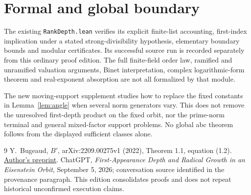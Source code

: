 \documentclass[11pt]{amsart}
\theoremstyle{definition}\newtheorem{definition}[theorem]{Definition}
\theoremstyle{remark}\newtheorem{remark}[theorem]{Remark}
\begin{document}
\section{Formal and global boundary}
The existing \texttt{RankDepth.lean} verifies its explicit finite-list accounting, first-index implication under a stated strong-divisibility hypothesis, elementary boundary bounds and modular certificates. Its successful source run is recorded separately from this ordinary proof edition. The full finite-field order law, ramified and unramified valuation arguments, Binet interpretation, complex logarithmic-form theorem and real-exponent absorption are not all formalized by that module.

The new moving-support supplement studies how to replace the fixed constants in Lemma~\ref{lem:angle} when several norm generators vary. This does not remove the unresolved first-depth product on the fixed orbit, nor the prime-norm terminal and general mixed-factor support problems. No global abc theorem follows from the displayed sufficient classes alone.
\begin{thebibliography}{9}
 Y.~Bugeaud, $B'$, arXiv:2209.00275v1 (2022), Theorem 1.1, equation (1.2). \href{https://arxiv.org/abs/2209.00275}{Author's preprint}.
 ChatGPT, \emph{First-Appearance Depth and Radical Growth in an Eisenstein Orbit}, September 5, 2026; conversation source identified in the provenance paragraph. This edition consolidates proofs and does not repeat historical unconfirmed execution claims.
\end{thebibliography}
\end{document}
